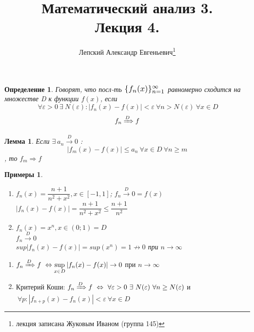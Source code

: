\documentclass[a4paper, 12pt]{article}
\title{\vspace{-2.0cm}Математический анализ 3.\\Лекция 4.}
\author{Лепский Александр Евгеньевич\footnote{лекция записана Жуковым Иваном (группа 145)}}
\newtheorem{Definition}{Определение}
\newtheorem{Lemma}{Лемма}
\newtheorem{Examples}{Примеры}
\begin{document}
    \maketitle
    
    \begin{Definition}
        Говорят, что посл-ть $\scalebox{1.2}{$\{f_n(x)\}^{\infty}_{n = 1}$}$ равномерно сходится
        на множестве D к функции $f(x)$, если\\
        \[\ \forall \varepsilon > 0
        \ \exists \  N(\varepsilon): \left| f_n(x) - f(x) \right|
        < \varepsilon \ \forall n > N(\varepsilon) \ \forall x \in D\]         
        \[f_n \xRightarrow{D} f\]
    \end{Definition}
    \begin{Lemma}
        Если $\exists \ a_n \xrightarrow{D} 0$ :
        \[ \left| f_m(x) - f(x)\right| \le a_n \ \forall x \in D \ \forall n
        \ge m\], то $f_m \Rightarrow f$
    \end{Lemma}
    \begin{Examples}
        \leavevmode
        \begin{enumerate}
            \item
            $f_n(x) = \dfrac{n + 1}{n^2 + x^2}, x \in [-1, 1]$;
            $f_n \xrightarrow{D} 0 = f(x)$\\
            $\left| f_n(x) - f(x)\right| = \dfrac{n + 1}{n^2 + x^2} \le
            \dfrac{n + 1}{n^2}$

            \item
            $f_n(x) = x^n, x \in (0; 1) = D$ \\
            $f_n \xrightarrow{D} 0$ \\
            $sup \left| f_n(x) - f(x) \right| = sup(x^n) = 1 \not \rightarrow 0$
            при $n \rightarrow \infty$

        \end{enumerate}
    \end{Examples}

    \begin{enumerate}
        \item 
        $f_n \xRightarrow{D} f \ \Leftrightarrow \underset{x \in D}{\sup}
        \left| f_n(x) - f(x)\right| \rightarrow 0$  при $n \rightarrow \infty$

        \item
        Критерий Коши:
        $f_n \xRightarrow{D} f \ \Leftrightarrow \ \forall \varepsilon > 0
        \ \exists \ N(\varepsilon) \ \forall n \ge N(\varepsilon)$ и\\
        $\ \forall p: \left| f_{n + p}(x) - f_n(x) \right| <
        \varepsilon \ \forall x \in D$ 
    \end{enumerate}
\end{document}
